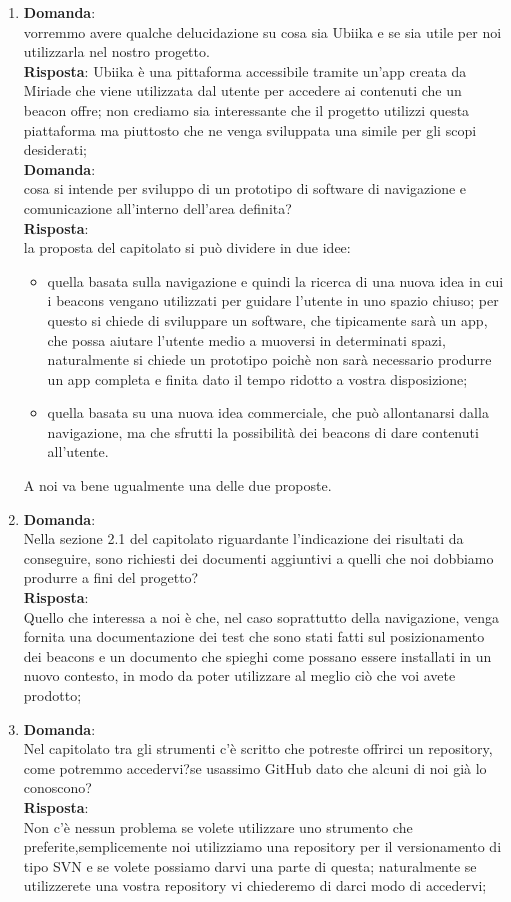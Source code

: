 \documentclass[a4paper,titlepage]{article}
\begin{document}
\begin{enumerate}
  \item \textbf{Domanda}: \\
  vorremmo avere qualche delucidazione su cosa sia Ubiika e se sia utile per noi utilizzarla nel nostro progetto. \\
  \textbf{Risposta}:
  Ubiika è una pittaforma accessibile tramite un'app creata da Miriade che viene utilizzata dal utente per accedere ai contenuti che un beacon offre; non crediamo sia interessante che il progetto utilizzi questa piattaforma ma piuttosto che ne venga sviluppata una simile per gli scopi desiderati;\\
  \textbf{Domanda}: \\
  cosa si intende per sviluppo di un prototipo di software di navigazione e comunicazione all’interno dell’area definita?\\
  \textbf{Risposta}: \\
  la proposta del capitolato si può dividere in due idee:
  \begin{itemize}
  	\item quella basata sulla navigazione e quindi la ricerca di una nuova idea in cui i beacons vengano utilizzati per guidare l'utente in uno spazio chiuso; per questo si chiede di sviluppare un software, che tipicamente sarà un app, che possa aiutare l'utente medio a muoversi in determinati spazi, naturalmente si chiede un prototipo poichè non sarà necessario produrre un app completa e finita dato il tempo ridotto a vostra disposizione;
  	\item quella basata su una nuova idea commerciale, che può allontanarsi dalla navigazione, ma che sfrutti la possibilità dei beacons di dare contenuti all'utente.
  \end{itemize}
  A noi va bene ugualmente una delle due proposte.
  \item \textbf{Domanda}:\\
  Nella sezione 2.1 del capitolato riguardante l'indicazione dei risultati da conseguire, sono richiesti dei documenti aggiuntivi a quelli che noi dobbiamo produrre a fini del progetto?\\
  \textbf{Risposta}: \\ 
  Quello che interessa a noi è che, nel caso soprattutto della navigazione, venga fornita una documentazione dei test che sono stati fatti sul posizionamento dei beacons e un documento che spieghi come possano essere installati in un nuovo contesto, in modo da poter utilizzare al meglio ciò che voi avete prodotto;
  \item \textbf{Domanda}:\\
  Nel capitolato tra gli strumenti c'è scritto che potreste offrirci un repository, come potremmo accedervi?se usassimo GitHub dato che alcuni di noi già lo conoscono?\\
  \textbf{Risposta}: \\
  Non c'è nessun problema se volete utilizzare uno strumento che preferite,semplicemente noi utilizziamo una repository per il versionamento di tipo SVN e se volete possiamo darvi una parte di questa; naturalmente se utilizzerete una vostra repository vi chiederemo di darci modo di accedervi;
\end{enumerate}
\end{document}
